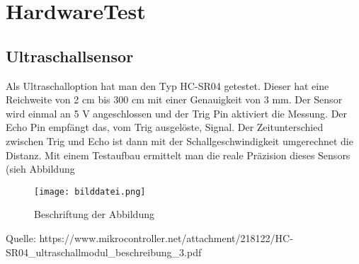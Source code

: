 \documentclass[../main.tex]{subfiles}
\begin{document}
\newpage
\section{HardwareTest}

\subsection{Ultraschallsensor}
Als Ultraschalloption hat man den Typ HC-SR04 getestet. Dieser hat eine Reichweite von 2 cm bis 300 cm mit einer Genauigkeit von 3 mm. Der Sensor wird einmal an 5 V angeschlossen und der Trig Pin aktiviert die Messung. Der Echo Pin empfängt das, vom Trig ausgelöste, Signal. Der Zeitunterschied zwischen Trig und Echo ist dann mit der Schallgeschwindigkeit umgerechnet die Distanz. Mit einem Testaufbau ermittelt man die reale Präzision dieses Sensors (sieh Abbildung 

\begin{figure}[h] %
    \centering
    \texttt{[image: bilddatei.png]} %
    \caption{Beschriftung der Abbildung}
    \label{fig:beispielbild} %
\end{figure}

Quelle: https://www.mikrocontroller.net/attachment/218122/HC-SR04_ultraschallmodul_beschreibung_3.pdf
\end{document}
